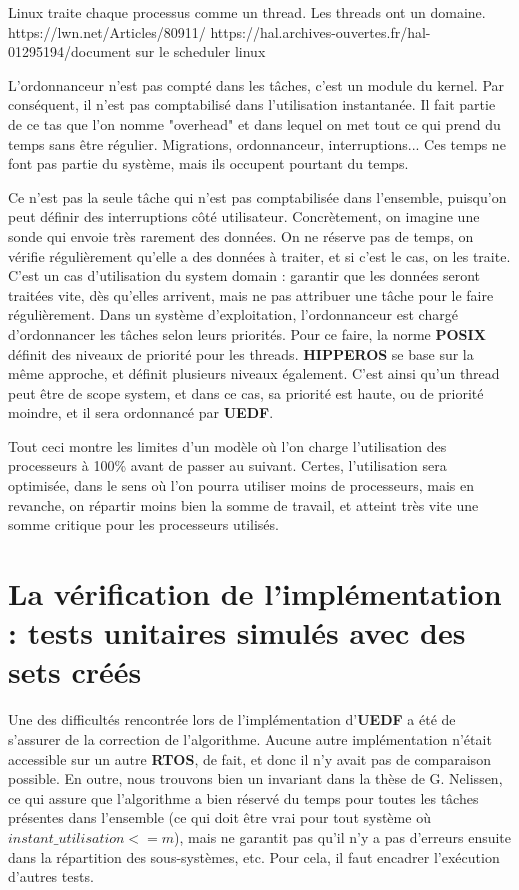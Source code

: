 	Linux traite chaque processus comme un thread. Les threads ont un domaine. 
	https://lwn.net/Articles/80911/
	https://hal.archives-ouvertes.fr/hal-01295194/document  sur le scheduler linux
	

	L'ordonnanceur n'est pas compté dans les tâches, c'est un module du kernel. Par conséquent, il n'est pas comptabilisé 
	dans l'utilisation instantanée. Il fait partie de ce tas que l'on nomme "overhead" et dans lequel 
	on met tout ce qui prend du temps sans être régulier. 
	Migrations, ordonnanceur, interruptions... Ces temps ne font pas partie du système, mais ils occupent
	pourtant du temps.
	
	Ce n'est pas la seule tâche qui n'est pas comptabilisée dans l'ensemble, puisqu'on peut définir des 
	interruptions côté utilisateur. 
	Concrètement, on imagine une sonde qui envoie très rarement des données. On ne réserve 
	pas de temps, on vérifie régulièrement qu'elle a des données à traiter, et si c'est le cas, on les traite.\\
	C'est un cas d'utilisation du system domain : garantir que les données seront traitées vite, dès qu'elles arrivent, 
	mais ne pas attribuer une tâche pour le faire régulièrement.
	Dans un système d'exploitation, l'ordonnanceur est chargé d'ordonnancer les tâches selon leurs priorités. 
	Pour ce faire, la norme \textbf{POSIX} définit des niveaux de priorité pour les threads. 
	\textbf{HIPPEROS }se base sur la même approche, et définit plusieurs niveaux également. C'est ainsi 
	qu'un thread peut être de scope system, et dans ce cas, sa priorité est haute, ou de priorité 
	moindre, et il sera ordonnancé par \textbf{UEDF}.\newline
	
	Tout ceci montre les limites d'un modèle où l'on charge l'utilisation des processeurs à 100\% avant de 
	passer au suivant. Certes, l'utilisation sera optimisée, dans le sens où l'on 
	pourra utiliser moins de processeurs, mais en revanche, on 
	répartir moins bien la somme de travail, et atteint très vite une somme critique pour les processeurs utilisés.

\section{La vérification de l'implémentation : tests unitaires simulés avec des sets créés}

	Une des difficultés rencontrée lors de l'implémentation d'\textbf{UEDF} a été de s'assurer de la correction de l'algorithme. 
	Aucune autre implémentation n'était accessible sur un autre \textbf{RTOS}, de fait, et donc il n'y avait pas de 
	comparaison possible. En outre, nous trouvons bien un invariant dans la thèse de G. Nelissen, ce qui assure 
	que l'algorithme a bien réservé du temps pour toutes les tâches présentes dans l'ensemble 
	(ce qui doit être vrai pour tout système où $instant\_utilisation <= m$), mais ne garantit pas 
	qu'il n'y a pas d'erreurs ensuite dans la répartition des sous-systèmes, etc. Pour cela, il faut encadrer 
	l'exécution d'autres tests. \newline

